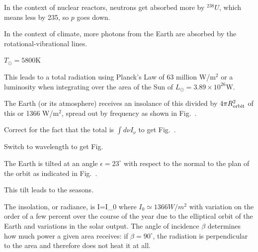 \documentclass[11pt]{book}
\begin{document}
\bee
\item
In the context of nuclear reactors, neutrons get absorbed more by $^{238}U$, which means less by 235, so $p$ goes down.
\item In the context of climate, more photons from the Earth are absorbed by the rotational-vibrational lines.
\eee




\bei
\item $T_\odot=5800$K
\item This leads to a total radiation using Planck's Law of 63 million W/m$^2$ or a luminosity when integrating over the area of the Sun of $L_\odot=3.89\times 10^{26}$W.
\item The Earth (or its atmosphere) receives an insolance of this divided by $4\pi R_{\rm orbit}^2$ of this or 1366 W/m$^2$, spread out by frequency as shown in Fig.~.
\item Correct for the fact that the total is $\int d\nu I_\nu$ to get Fig.~.
\item Switch to wavelength to get Fig.~
\eei





\bei
\item The Earth is tilted at an angle $\epsilon=23^\circ$ with respect to the normal to the plan of the orbit as indicated in Fig.~.
\item This tilt leads to the seasons.
\item The insolation, or radiance, is
\be
I=I_0\cos\beta
\ee
where $I_0\simeq 1366 W/m^2$ with variation on the order of a few percent over the course of the year due to the elliptical orbit of the Earth and variations in the solar output. The angle of incidence $\beta$ determines how much power a given area receives: if $\beta=90^\circ$, the radiation is perpendicular to the area and therefore does not heat it at all. 
\end{document}
